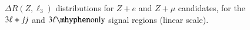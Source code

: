 \begin{appendices}
\begin{figure}
{  }
  \caption{$\Delta R(Z,\ell_3)$ distributions for $Z+e$ and $Z+\mu$ candidates, for the $3\ell+jj$ and $\threelo$ signal regions (linear scale).}
  \label{fig:SR-dR-2-linear}
\end{figure}



\end{appendices}

